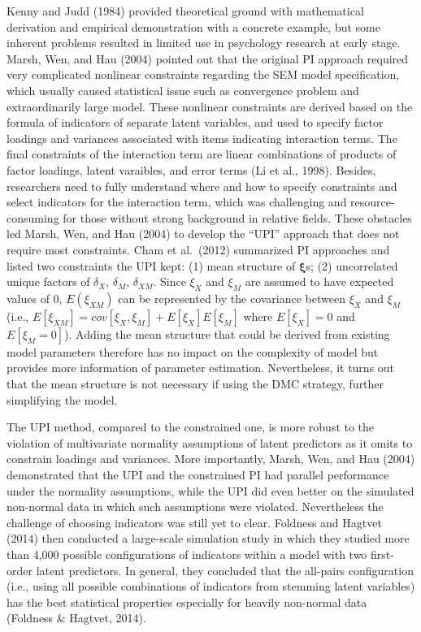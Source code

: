 \documentclass[
  man]{apa7}
\begin{document}
Kenny and Judd (1984) provided theoretical ground with mathematical derivation and empirical demonstration with a concrete example, but some inherent problems resulted in limited use in psychology research at early stage. Marsh, Wen, and Hau (2004) pointed out that the original PI approach required very complicated nonlinear constraints regarding the SEM model specification, which usually caused statistical issue such as convergence problem and extraordinarily large model. These nonlinear constraints are derived based on the formula of indicators of separate latent variables, and used to specify factor loadings and variances associated with items indicating interaction terms. The final constraints of the interaction term are linear combinations of products of factor loadings, latent varaibles, and error terms (Li et al., 1998). Besides, researchers need to fully understand where and how to specify constraints and select indicators for the interaction term, which was challenging and resource-consuming for those without strong background in relative fields. These obstacles led Marsh, Wen, and Hau (2004) to develop the ``UPI'' approach that does not require most constraints. Cham et al.~(2012) summarized PI approaches and listed two constraints the UPI kept: (1) mean structure of \(\boldsymbol{\xi}\)s; (2) uncorrelated unique factors of \(\delta_{X}\), \(\delta_{M}\), \(\delta_{XM}\). Since \(\xi_{X}\) and \(\xi_{M}\) are assumed to have expected values of 0, \(E(\xi_{XM})\) can be represented by the covariance between \(\xi_{X}\) and \(\xi_{M}\) (i.e., \(E[\xi_{XM}] = cov[\xi_{X}, \xi_{M}] + E[\xi_{X}]E[\xi_{M}]\) where \(E[\xi_{X}] = 0\) and \(E[\xi_{M} = 0]\)). Adding the mean structure that could be derived from existing model parameters therefore has no impact on the complexity of model but provides more information of parameter estimation. Nevertheless, it turns out that the mean structure is not necessary if using the DMC strategy, further simplifying the model.

The UPI method, compared to the constrained one, is more robust to the violation of multivariate normality assumptions of latent predictors as it omits to constrain loadings and variances. More importantly, Marsh, Wen, and Hau (2004) demonstrated that the UPI and the constrained PI had parallel performance under the normality assumptions, while the UPI did even better on the simulated non-normal data in which such assumptions were violated. Nevertheless the challenge of choosing indicators was still yet to clear. Foldness and Hagtvet (2014)
then conducted a large-scale simulation study in which they studied more than 4,000 possible configurations of indicators within a model with two first-order latent predictors. In general, they concluded that the all-pairs configuration (i.e., using all possible combinations of indicators from stemming latent variables) has the best statistical properties especially for heavily non-normal data (Foldness \(\&\) Hagtvet, 2014).
\end{document}
